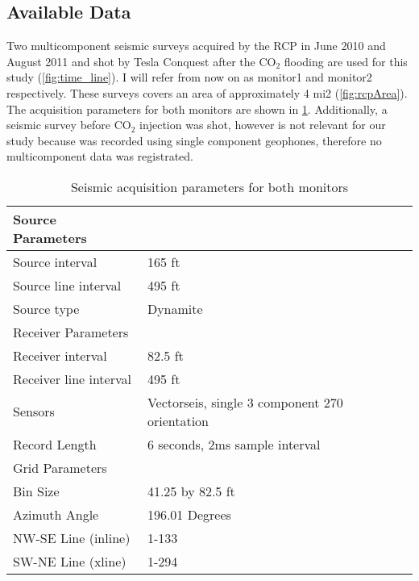 \newpage

\subsection{Available Data}

Two multicomponent seismic surveys acquired by the RCP in June 2010 and 
August 2011 and shot by Tesla Conquest after the CO$_2$ flooding are used 
for this study (\ref{fig:time_line}).  I will refer from now on as monitor1 
and monitor2 respectively. These surveys covers an area of approximately 
4 mi2 (\ref{fig:rcpArea}). The acquisition parameters for both monitors
are shown in \ref{tab:seispar}. Additionally, a seismic survey before
CO$_2$ injection was shot, however is not relevant for our study because 
was recorded using single component geophones, therefore no multicomponent 
data was registrated.




\begin{table}[h!]
\caption{ Seismic acquisition parameters for both monitors \label{tab:seispar}}
\begin{center}
\begin{tabular}{ | l | p{5cm} |}
\hline
Source Parameters             &   \\
\hline
Source interval            & 165 ft  \\
Source line interval           & 495 ft   \\
Source type     & Dynamite   \\
\hline
Receiver Parameters             &   \\
\hline
Receiver interval            & 82.5 ft  \\
Receiver line interval           & 495 ft   \\
Sensors &Vectorseis, single 3 component  270 orientation \\
Record Length & 6 seconds, 2ms sample interval\\
\hline
Grid Parameters             &   \\
\hline
Bin Size & 41.25 by 82.5 ft \\
Azimuth Angle & 196.01 Degrees \\
NW-SE Line (inline) & 1-133 \\
SW-NE Line (xline) & 1-294 \\
\hline
\end{tabular}
\end{center}
\end{table}

